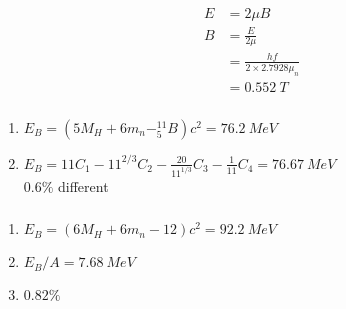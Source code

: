 \documentclass{article}
\begin{document}
\begin{align*}
  E & = 2 \mu B                           \\
  B & = \frac{E}{2 \mu}                   \\
    & = \frac{h f}{2 \times 2.7928 \mu_n} \\
    & = \qty{0.552}{T}
\end{align*}

\setcounter{subsubsection}{4}
\subsubsection{}

\begin{enumerate}
  \item $E_B = (5 M_H + 6 m_n - ^{11}_5 B) c^2 = \qty{76.2}{MeV}$

  \item $E_B = 11 C_1 - 11^{2 / 3} C_2 - \frac{20}{11^{1 / 3}} C_3 - \frac{1}{11} C_4 = \qty{76.67}{MeV}$ \\ $0.6\%$ different
\end{enumerate}

\setcounter{subsubsection}{6}
\subsubsection{}

\begin{enumerate}
  \item $E_B = (6 M_H + 6 m_n - 12) c^2 = \qty{92.2}{MeV}$

  \item $E_B / A = \qty{7.68}{MeV}$

  \item $0.82\%$
\end{enumerate}

\setcounter{subsubsection}{8}
\subsubsection{}
\end{document}
